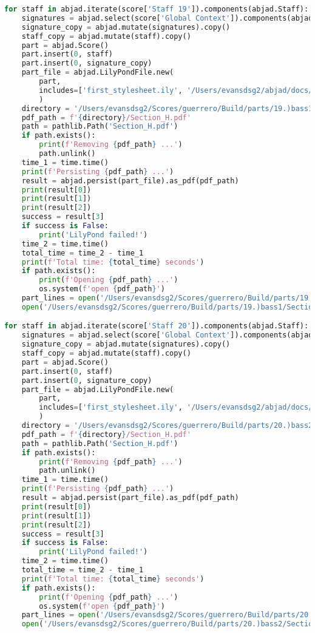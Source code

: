 \begin{lstlisting}[language=Python, caption=Invocation Source Code]
for staff in abjad.iterate(score['Staff 19']).components(abjad.Staff):
    signatures = abjad.select(score['Global Context']).components(abjad.Staff)
    signature_copy = abjad.mutate(signatures).copy()
    staff_copy = abjad.mutate(staff).copy()
    part = abjad.Score()
    part.insert(0, staff)
    part.insert(0, signature_copy)
    part_file = abjad.LilyPondFile.new(
        part,
        includes=['first_stylesheet.ily', '/Users/evansdsg2/abjad/docs/source/_stylesheets/abjad.ily'],
        )
    directory = '/Users/evansdsg2/Scores/guerrero/Build/parts/19.)bass1'
    pdf_path = f'{directory}/Section_H.pdf'
    path = pathlib.Path('Section_H.pdf')
    if path.exists():
        print(f'Removing {pdf_path} ...')
        path.unlink()
    time_1 = time.time()
    print(f'Persisting {pdf_path} ...')
    result = abjad.persist(part_file).as_pdf(pdf_path)
    print(result[0])
    print(result[1])
    print(result[2])
    success = result[3]
    if success is False:
        print('LilyPond failed!')
    time_2 = time.time()
    total_time = time_2 - time_1
    print(f'Total time: {total_time} seconds')
    if path.exists():
        print(f'Opening {pdf_path} ...')
        os.system(f'open {pdf_path}')
    part_lines = open('/Users/evansdsg2/Scores/guerrero/Build/parts/19.)bass1/Section_H.ly').readlines()
    open('/Users/evansdsg2/Scores/guerrero/Build/parts/19.)bass1/Section_H.ly', 'w').writelines(part_lines[15:-1])

for staff in abjad.iterate(score['Staff 20']).components(abjad.Staff):
    signatures = abjad.select(score['Global Context']).components(abjad.Staff)
    signature_copy = abjad.mutate(signatures).copy()
    staff_copy = abjad.mutate(staff).copy()
    part = abjad.Score()
    part.insert(0, staff)
    part.insert(0, signature_copy)
    part_file = abjad.LilyPondFile.new(
        part,
        includes=['first_stylesheet.ily', '/Users/evansdsg2/abjad/docs/source/_stylesheets/abjad.ily'],
        )
    directory = '/Users/evansdsg2/Scores/guerrero/Build/parts/20.)bass2'
    pdf_path = f'{directory}/Section_H.pdf'
    path = pathlib.Path('Section_H.pdf')
    if path.exists():
        print(f'Removing {pdf_path} ...')
        path.unlink()
    time_1 = time.time()
    print(f'Persisting {pdf_path} ...')
    result = abjad.persist(part_file).as_pdf(pdf_path)
    print(result[0])
    print(result[1])
    print(result[2])
    success = result[3]
    if success is False:
        print('LilyPond failed!')
    time_2 = time.time()
    total_time = time_2 - time_1
    print(f'Total time: {total_time} seconds')
    if path.exists():
        print(f'Opening {pdf_path} ...')
        os.system(f'open {pdf_path}')
    part_lines = open('/Users/evansdsg2/Scores/guerrero/Build/parts/20.)bass2/Section_H.ly').readlines()
    open('/Users/evansdsg2/Scores/guerrero/Build/parts/20.)bass2/Section_H.ly', 'w').writelines(part_lines[15:-1])


\end{lstlisting}
